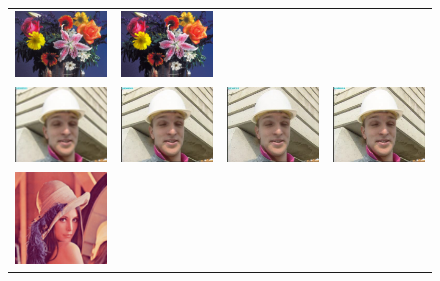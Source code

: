 \documentclass[10pt,twocolumn,letterpaper]{article}
\begin{document}
\begin{figure}[h!]
\begin{tabular}{cccc}
\includegraphics[width=1.5in]{images/used/appendix/jpg/Set14/flowers_SRGAN-VGG54} &
\includegraphics[width=1.5in]{images/used/appendix/jpg/Set14/flowers_HR} \\
\includegraphics[width=1.5in]{images/used/appendix/jpg/Set14/foreman_bicubic}&
\includegraphics[width=1.5in]{images/used/appendix/jpg/Set14/foreman_SRResNet-MSE} &
\includegraphics[width=1.5in]{images/used/appendix/jpg/Set14/foreman_SRGAN-VGG54} &
\includegraphics[width=1.5in]{images/used/appendix/jpg/Set14/foreman_HR} \\
\includegraphics[width=1.5in]{images/used/appendix/jpg/Set14/lenna_bicubic}&

\end{tabular}
\end{figure}
\end{document}
